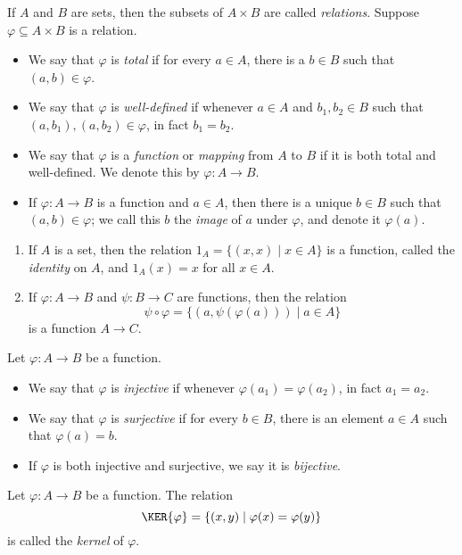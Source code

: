 \documentclass{article}
\begin{document}

\begin{dfn}[Function]
If $A$ and $B$ are sets, then the subsets of $A \times B$ are called \emph{relations}. Suppose $\varphi \subseteq A \times B$ is a relation.
\begin{itemize}
\item We say that $\varphi$ is \emph{total} if for every $a \in A$, there is a $b \in B$ such that $(a,b) \in \varphi$.
\item We say that $\varphi$ is \emph{well-defined} if whenever $a \in A$ and $b_1,b_2 \in B$ such that $(a,b_1), (a,b_2) \in \varphi$, in fact $b_1 = b_2$.
\item We say that $\varphi$ is a \emph{function} or \emph{mapping} from $A$ to $B$ if it is both total and well-defined. We denote this by $\varphi : A \rightarrow B$.
\item If $\varphi : A \rightarrow B$ is a function and $a \in A$, then there is a unique $b \in B$ such that $(a,b) \in \varphi$; we call this $b$ the \emph{image} of $a$ under $\varphi$, and denote it $\varphi(a)$.
\end{itemize}
\end{dfn}

\begin{prop} \mbox{}
\begin{enumerate}
\item If $A$ is a set, then the relation $1_A = \{ (x,x) \mid x \in A \}$ is a function, called the \emph{identity} on $A$, and $1_A(x) = x$ for all $x \in A$.
\item If $\varphi : A \rightarrow B$ and $\psi : B \rightarrow C$ are functions, then the relation \[ \psi \circ \varphi = \{ (a, \psi(\varphi(a))) \mid a \in A \} \] is a function $A \rightarrow C$.
\end{enumerate}
\end{prop}

\begin{dfn}
Let $\varphi : A \rightarrow B$ be a function.
\begin{itemize}
\item We say that $\varphi$ is \emph{injective} if whenever $\varphi(a_1) = \varphi(a_2)$, in fact $a_1 = a_2$.
\item We say that $\varphi$ is \emph{surjective} if for every $b \in B$, there is an element $a \in A$ such that $\varphi(a) = b$.
\item If $\varphi$ is both injective and surjective, we say it is \emph{bijective}.
\end{itemize}
\end{dfn}

\begin{dfn}[Kernel]
Let $\varphi : A \rightarrow B$ be a function. The relation \[ \KER{\varphi} = \{ (x,y) \mid \varphi(x) = \varphi(y) \} \] is called the \emph{kernel} of $\varphi$.
\end{dfn}
\end{document}
